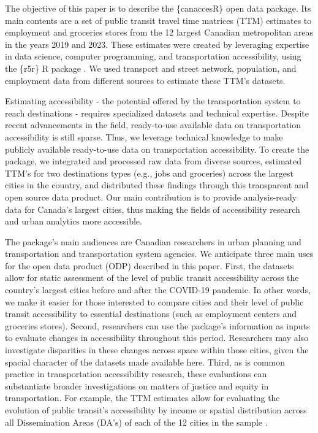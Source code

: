 \documentclass[Royal,times,sageh]{sagej}
\begin{document}
The objective of this paper is to describe the \{canaccesR\} open data
package. Its main contents are a set of public transit travel time
matrices (TTM) estimates to employment and groceries stores from the 12
largest Canadian metropolitan areas in the years 2019 and 2023. These
estimates were created by leveraging expertise in data science, computer
programming, and transportation accessibility, using the \{r5r\} R
package \citep{pereiraR5rRapidRealistic2021}. We used transport and
street network, population, and employment data from different sources
to estimate these TTM's datasets.

Estimating accessibility - the potential offered by the transportation
system to reach destinations
\citep{paezMeasuringAccessibilityPositive2012} - requires specialized
datasets and technical expertise. Despite recent advancements in the
field, ready-to-use available data on transportation accessibility is
still sparse. Thus, we leverage technical knowledge to make publicly
available ready-to-use data on transportation accessibility. To create
the package, we integrated and processed raw data from diverse sources,
estimated TTM's for two destinations types (e.g., jobs and groceries)
across the largest cities in the country, and distributed these findings
through this transparent and open source data product. Our main
contribution is to provide analysis-ready data for Canada's largest
cities, thus making the fields of accessibility research and urban
analytics more accessible.

The package's main audiences are Canadian researchers in urban planning
and transportation and transportation system agencies. We anticipate
three main uses for the open data product (ODP) described in this paper.
First, the datasets allow for static assessment of the level of public
transit accessibility across the country's largest cities before and
after the COVID-19 pandemic. In other words, we make it easier for those
interested to compare cities and their level of public transit
accessibility to essential destinations (such as employment centers and
groceries stores). Second, researchers can use the package's information
as inputs to evaluate changes in accessibility throughout this period.
Researchers may also investigate disparities in these changes across
space within those cities, given the spacial character of the datasets
made available here. Third, as is common practice in transportation
accessibility research, these evaluations can substantiate broader
investigations on matters of justice and equity in transportation. For
example, the TTM estimates allow for evaluating the evolution of public
transit's accessibility by income or spatial distribution across all
Dissemination Areas (DA's) of each of the 12 cities in the sample
\citep{pargaDemocraticAccessOur2024}.
\end{document}
